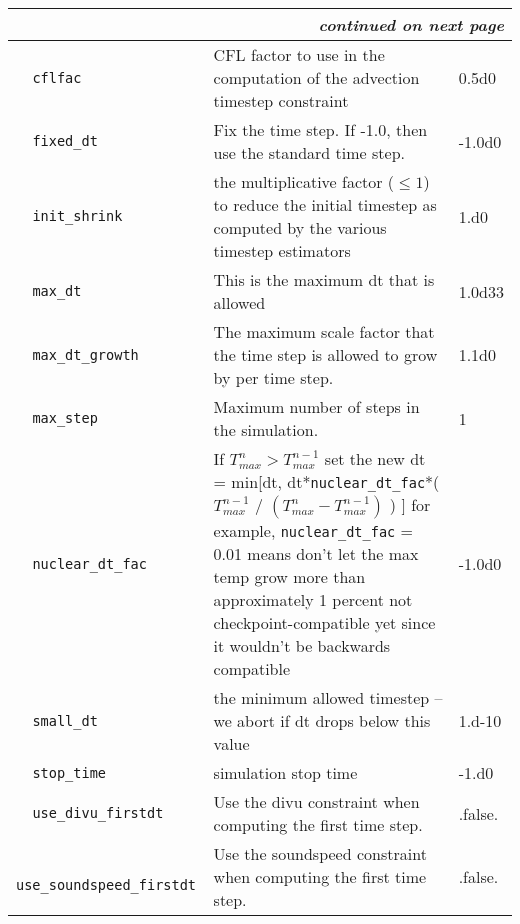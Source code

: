 \begin{landscape}
{\begin{center}
\begin{longtable}{|l|p{5.25in}|l|}
\multicolumn{3}{|r|}{{\em continued on next page}} \\ \hline
\endfoot

\hline 
\endlastfoot


\rowcolor{tableShade}
\verb=  cflfac  = &   CFL factor to use in the computation of the advection timestep constraint  &  0.5d0 \\
\verb=  fixed_dt  = &   Fix the time step.  If -1.0, then use the standard time step.  &  -1.0d0 \\
\rowcolor{tableShade}
\verb=  init_shrink  = &   the multiplicative factor ($\le 1$) to reduce the initial timestep as computed by the various timestep estimators  &  1.d0 \\
\verb=  max_dt  = &   This is the maximum dt that is allowed  &  1.0d33 \\
\rowcolor{tableShade}
\verb=  max_dt_growth  = &   The maximum scale factor that the time step is allowed to grow by per time step.  &  1.1d0 \\
\verb=  max_step  = &   Maximum number of steps in the simulation.  &  1 \\
\rowcolor{tableShade}
\verb=  nuclear_dt_fac  = &   If $T_{max}^n > T_{max}^{n-1}$ set the new dt =   min[dt, dt*{\tt nuclear\_dt\_fac}*( $T_{max}^{n-1}$ / $(T_{max}^n-T_{max}^{n-1})$ ) ] for example, {\tt nuclear\_dt\_fac} = 0.01 means don't let the max temp grow more than approximately 1 percent not checkpoint-compatible yet since it wouldn't be backwards compatible  &  -1.0d0 \\
\verb=  small_dt  = &   the minimum allowed timestep -- we abort if dt drops below this value  &  1.d-10 \\
\rowcolor{tableShade}
\verb=  stop_time  = &   simulation stop time  &  -1.d0 \\
\verb=  use_divu_firstdt  = &   Use the divu constraint when computing the first time step.  &  .false. \\
\rowcolor{tableShade}
\verb=  use_soundspeed_firstdt  = &   Use the soundspeed constraint when computing the first time step.  &  .false. \\


\end{longtable}
\end{center}

} %


\end{landscape}

%


